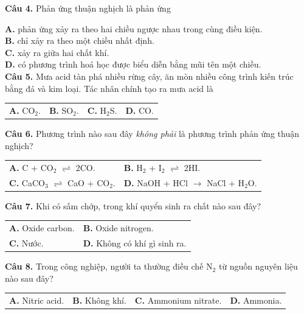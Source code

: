 \documentclass[11pt,a4paper]{article}
\begin{document}
\textbf{Câu 4.} Phản ứng thuận nghịch là phản ứng

\quad \textbf{A.} phản ứng xảy ra theo hai chiều ngược nhau trong cùng điều kiện.\\
\quad \textbf{B.} chỉ xảy ra theo một chiều nhất định.\\
\quad \textbf{C.} xảy ra giữa hai chất khí.\\
\quad \textbf{D.} có phương trình hoá học được biểu diễn bằng mũi tên một chiều.\\

\textbf{Câu 5.} Mưa acid tàn phá nhiều rừng cây, ăn mòn nhiều công trình kiến trúc bằng đá và kim loại. Tác nhân chính tạo ra mưa acid là

\begin{tabularx}{\textwidth}{@{}XXXX@{}}
\textbf{A.} CO$_{2}$. & \textbf{B.} SO$_{2}$. & \textbf{C.} H$_{2}$S. & \textbf{D.} CO. \\
\end{tabularx}

\textbf{Câu 6.} Phương trình nào sau đây \textit{không phải} là phương trình phản ứng thuận nghịch?

\begin{tabularx}{\textwidth}{@{}XX@{}}
\textbf{A.} C + CO$_{2}$ $\rightleftharpoons$ 2CO. & \textbf{B.} H$_{2}$ + I$_{2}$ $\rightleftharpoons$ 2HI. \\
\textbf{C.} CaCO$_{3}$ $\rightleftharpoons$ CaO + CO$_{2}$. & \textbf{D.} NaOH + HCl $\longrightarrow$ NaCl + H$_{2}$O. \\
\end{tabularx}

\textbf{Câu 7.} Khi có sấm chớp, trong khí quyển sinh ra chất nào sau đây?

\begin{tabularx}{\textwidth}{@{}XX@{}}
\textbf{A.} Oxide carbon. & \textbf{B.} Oxide nitrogen. \\
\textbf{C.} Nước. & \textbf{D.} Không có khí gì sinh ra. \\
\end{tabularx}

\textbf{Câu 8.} Trong công nghiệp, người ta thường điều chế N$_{2}$ từ nguồn nguyên liệu nào sau đây?

\begin{tabularx}{\textwidth}{@{}XXXX@{}}
\textbf{A.} Nitric acid. & \textbf{B.} Không khí. & \textbf{C.} Ammonium nitrate. & \textbf{D.} Ammonia. \\
\end{tabularx}
\end{document}
